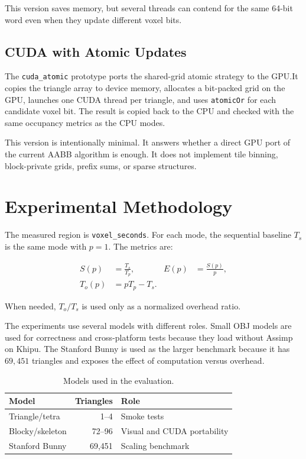 \documentclass[conference]{IEEEtran}
\begin{document}
This version saves memory, but several threads can contend for the same 64-bit
word even when they update different voxel bits.

\subsection{CUDA with Atomic Updates}

The \texttt{cuda\_atomic} prototype ports the shared-grid atomic strategy to
the GPU.\@ It copies the triangle array to device memory, allocates a
bit-packed grid on the GPU, launches one CUDA thread per triangle, and uses
\texttt{atomicOr} for each candidate voxel bit. The result is copied back to
the CPU and checked with the same occupancy metrics as the CPU modes.

This version is intentionally minimal. It answers whether a direct GPU port of
the current AABB algorithm is enough. It does not implement tile binning,
block-private grids, prefix sums, or sparse structures.

\section{Experimental Methodology}

The measured region is \texttt{voxel\_seconds}. For each mode, the sequential
baseline $T_s$ is the same mode with $p=1$. The metrics are:

\begin{align}
  S(p)   & =\frac{T_s}{T_p},    &
  E(p)   & =\frac{S(p)}{p},       \\
  T_o(p) & =pT_p-T_s.
\end{align}

When needed, $T_o/T_s$ is used only as a normalized overhead ratio.

The experiments use several models with different roles. Small OBJ models are
used for correctness and cross-platform tests because they load without Assimp
on Khipu. The Stanford Bunny is used as the larger benchmark because it has
$69{,}451$ triangles and exposes the effect of computation versus overhead.

\begin{table}[t]
  \centering
  \caption{Models used in the evaluation.}
  \begin{tabular}{lrl}
    \toprule
    Model           & Triangles & Role                        \\
    \midrule
    Triangle/tetra  & 1--4      & Smoke tests                 \\
    Blocky/skeleton & 72--96    & Visual and CUDA portability \\
    Stanford Bunny  & 69,451    & Scaling benchmark           \\
    \bottomrule
  \end{tabular}
\end{table}
\end{document}
